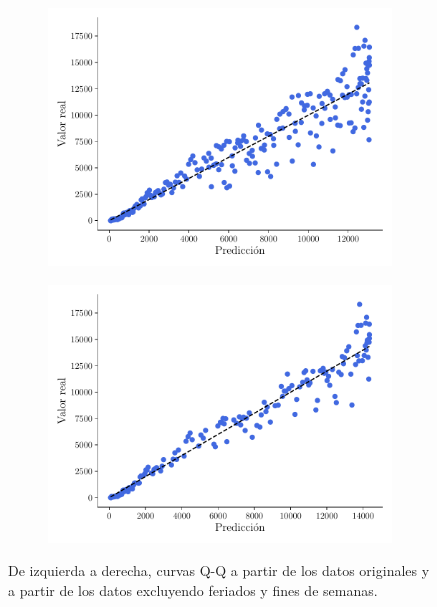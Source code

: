 \documentclass[twocolumn,aps,prl]{revtex4-1}
\begin{document}
\begin{figure}[ht!]
  \begin{subfigure}[b]{0.49\linewidth}
      \centering
      \includegraphics[width = 1.05\textwidth]{figuras/ex02-qq.pdf}
      \caption{}
      \label{fig:ex02-qq}
  \end{subfigure}\quad
  \begin{subfigure}[b]{0.49\linewidth}
      \centering
      \includegraphics[width = 1.05\textwidth]{figuras/ex02-qq-sin-Finde.pdf}
      \caption{}
      \label{fig:ex02-qq-sin-Finde}
  \end{subfigure}
  \caption{De izquierda a derecha, curvas Q-Q a partir de los datos originales y a partir de los datos excluyendo feriados y fines de semanas.}
  \label{fig:ex02-qq-ambas}
\end{figure}
\end{document}
